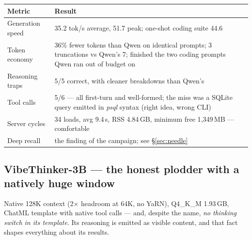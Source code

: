 \documentclass[11pt,a4paper]{article}
\begin{document}
\begin{center}
\small
\begin{tabularx}{\textwidth}{L{4.6cm} X}
\toprule
\textbf{Metric} & \textbf{Result} \\
\midrule
Generation speed & 35.2 tok/s average, 51.7 peak; one-shot coding suite 44.6 \\
Token economy & 36\% fewer tokens than Qwen on identical prompts; 3 truncations vs Qwen's 7; finished the two coding prompts Qwen ran out of budget on \\
Reasoning traps & 5/5 correct, with cleaner breakdowns than Qwen's \\
Tool calls & 5/6 --- all first-turn and well-formed; the miss was a SQLite query emitted in \emph{psql} syntax (right idea, wrong CLI) \\
Server cycles & 34 loads, avg 9.4\,s, RSS 4.84\,GB, minimum free 1{,}349\,MB --- comfortable \\
Deep recall & the finding of the campaign; see \S\ref{sec:needle} \\
\bottomrule
\end{tabularx}
\end{center}

\subsection{VibeThinker-3B --- the honest plodder with a natively huge window}
\label{sec:vibe}

Native 128K context (2$\times$ headroom at 64K, no YaRN), Q4\_K\_M 1.93\,GB,
ChatML template with native tool calls --- and, despite the name, \emph{no
thinking switch in its template}. Its reasoning is emitted as visible
content, and that fact shapes everything about its results.
\end{document}
